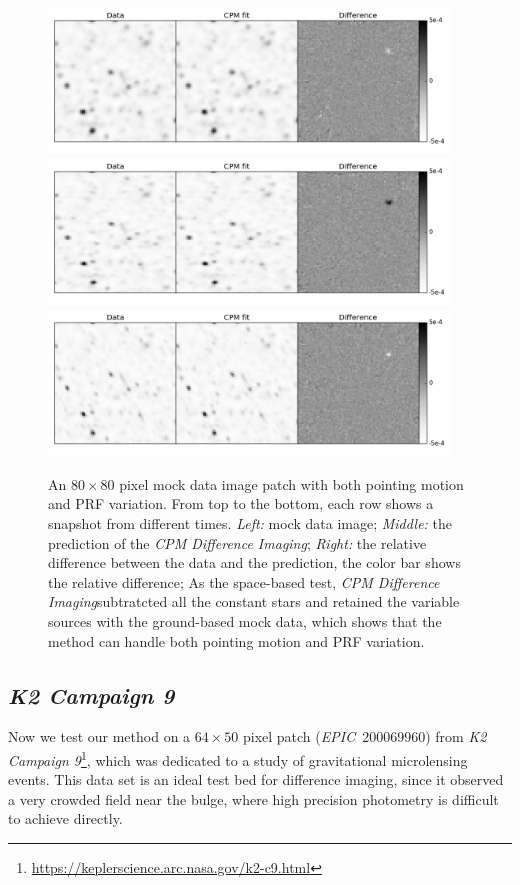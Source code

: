 \documentclass[12pt, preprint]{aastex}
\newcommand{\project}[1]{\textsl{#1}}
\newcommand{\cpmdiff}{\project{CPM Difference Imaging}}
\newcommand{\KTCN}{\project{K2 Campaign 9}}
\newcommand{\epic}{\project{EPIC}}
\begin{document}
\begin{figure}[p]
\begin{center}
\includegraphics[width=0.95\textwidth]{f2a}
\includegraphics[width=0.95\textwidth]{f2b}
\includegraphics[width=0.95\textwidth]{f2c}
\end{center}
\caption{
  \label{ground}
  An $80\times 80$ pixel mock data image patch with both pointing motion and PRF variation. From top to the bottom,  each row shows a snapshot from different times.
  \emph{Left:} mock data image;
  \emph{Middle:} the prediction of the \cpmdiff;
  \emph{Right:} the relative difference between the data and the prediction, the color bar shows the relative difference;
  As the space-based test, \cpmdiff subtratcted all the constant stars and retained the variable sources with the ground-based mock data, which shows that the method can handle both pointing motion and PRF variation. 
}
\end{figure}

\subsection{\KTCN}
Now we test our method on a $64\times50$ pixel patch (\epic\ 200069960) from \KTCN\footnote{\url{https://keplerscience.arc.nasa.gov/k2-c9.html}}, which was dedicated to a study of gravitational microlensing events.
This data set is an ideal test bed for difference imaging, since it observed a very crowded field near the bulge, where high precision photometry is difficult to achieve directly.
\end{document}
